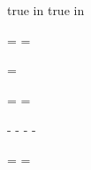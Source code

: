 \newdimen\paperwidth {} true in
\newdimen\paperheight {} true in

\newdimen\pagewidth \pagewidth=\paperwidth
\newdimen\pageheight \pageheight=\paperheight

\newdimen\innermargin \innermargin=5pc
\newdimen\outermargin \outermargin=3pc
\newdimen\topmargin \topmargin=4.5pc
\newdimen\bottommargin \bottommargin=\topmargin

\pdfpagewidth=\paperwidth
\pdfpageheight=\paperheight

\voffset=-1in
\hoffset=-1in
\advance\voffset\topmargin
\advance\hoffset\innermargin

\advance\pagewidth-\innermargin
\advance\pagewidth-\outermargin
\advance\pageheight-\topmargin
\advance\pageheight-\bottommargin

\hsize=\pagewidth
\vsize=\pageheight
